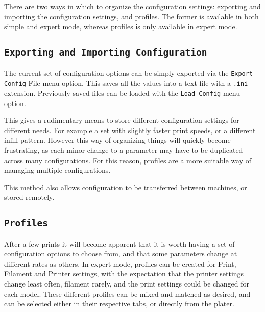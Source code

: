 
There are two ways in which to organize the configuration settings: exporting and importing the configuration settings, and profiles.  The former is available in both simple and expert mode, whereas profiles is only available in expert mode.

\subsection{\texttt{Exporting and Importing Configuration}} %
\label{sub:exporting_and_importing_configuration}

The current set of configuration options can be simply exported via the \texttt{Export Config} File menu option. This saves all the values into a text file with a \texttt{.ini} extension.  Previously saved files can be loaded with the \texttt{Load Config} menu option.

This gives a rudimentary means to store different configuration settings for different needs.  For example a set with slightly faster print speeds, or a different infill pattern.  However this way of organizing things will quickly become frustrating, as each minor change to a parameter may have to be duplicated across many configurations.  For this reason, profiles are a more suitable way of managing multiple configurations.

This method also allows configuration to be transferred between machines, or stored remotely.



\subsection{\texttt{Profiles}} %
\label{sec:profiles}

After a few prints it will become apparent that it is worth having a set of configuration options to choose from, and that some parameters change at different rates as others.  In expert mode, profiles can be created for Print, Filament and Printer settings, with the expectation that the printer settings change least often, filament rarely, and the print settings could be changed for each model.  These different profiles can be mixed and matched as desired, and can be selected either in their respective tabs, or directly from the plater.

